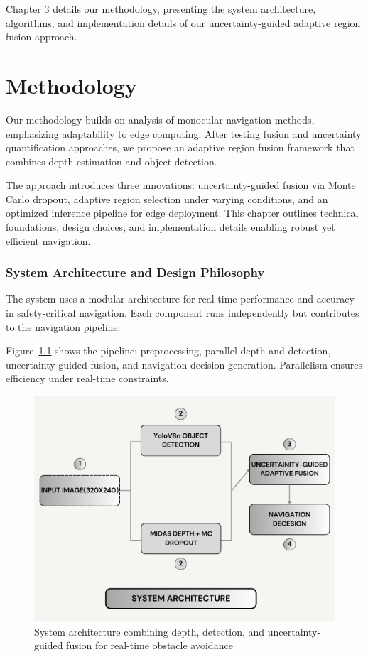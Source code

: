 \documentclass[12pt,oneside]{book}
\newcommand{\figref}[1]{Figure~\ref{#1}}
\begin{document}
\vspace{12pt}
Chapter 3 details our methodology, presenting the system architecture, algorithms, and implementation details of our uncertainty-guided adaptive region fusion approach.

\chapter{Methodology}

Our methodology builds on analysis of monocular navigation methods, emphasizing adaptability to edge computing. After testing fusion and uncertainty quantification approaches, we propose an adaptive region fusion framework that combines depth estimation and object detection.

The approach introduces three innovations: uncertainty-guided fusion via Monte Carlo dropout, adaptive region selection under varying conditions, and an optimized inference pipeline for edge deployment. This chapter outlines technical foundations, design choices, and implementation details enabling robust yet efficient navigation.

\subsection{System Architecture and Design Philosophy}

The system uses a modular architecture for real-time performance and accuracy in safety-critical navigation. Each component runs independently but contributes to the navigation pipeline.

\figref{fig:architecture} shows the pipeline: preprocessing, parallel depth and detection, uncertainty-guided fusion, and navigation decision generation. Parallelism ensures efficiency under real-time constraints.

\begin{figure}[p]
\centering
\includegraphics[width=1\textwidth,height=0.85\textheight,keepaspectratio]{system_architecture.png}
\vspace{1cm}
\caption{System architecture combining depth, detection, and uncertainty-guided fusion for real-time obstacle avoidance}
\label{fig:architecture}
\end{figure}
\end{document}
